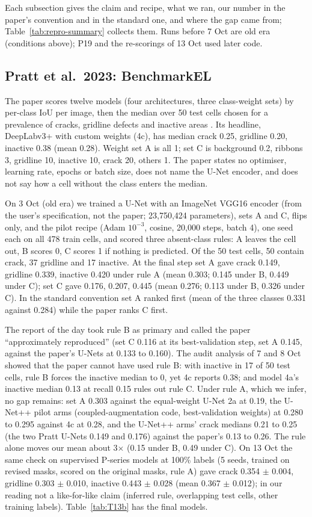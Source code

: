 Each subsection gives the claim and recipe, what we ran, our number in the paper's convention and in the standard one, and where the
gap came from; Table~\ref{tab:repro-summary} collects them. Runs before 7 Oct are old era (conditions above); P19 and the re-scorings
of 13 Oct used later code.

\subsection{Pratt et al.\ 2023: BenchmarkEL}\label{sec:repro-pratt}

The paper scores twelve models (four architectures, three class-weight sets) by per-class IoU per image, then the median over 50 test
cells chosen for a prevalence of cracks, gridline defects and inactive areas \citep{pratt2023benchmark}. Its headline, DeepLabv3+ with
custom weights (4c), has median crack 0.25, gridline 0.20, inactive 0.38 (mean 0.28). Weight set A is all 1; set C is background 0.2,
ribbons 3, gridline 10, inactive 10, crack 20, others 1. The paper states no optimiser, learning rate, epochs or batch size, does not
name the U-Net encoder, and does not say how a cell without the class enters the median.

On 3 Oct (old era) we trained a U-Net with an ImageNet VGG16 encoder (from the user's specification, not the paper; 23,750,424
parameters), sets A and C, flips only, and the pilot recipe (Adam $10^{-3}$, cosine, 20,000 steps, batch 4), one seed each on all 478
train cells, and scored three absent-class rules: A leaves the cell out, B scores 0, C scores 1 if nothing is predicted. Of the 50 test
cells, 50 contain crack, 37 gridline and 17 inactive. At the final step set A gave crack 0.149, gridline 0.339, inactive 0.420 under
rule A (mean 0.303; 0.145 under B, 0.449 under C); set C gave 0.176, 0.207, 0.445 (mean 0.276; 0.113 under B, 0.326 under C). In the
standard convention set A ranked first (mean of the three classes 0.331 against 0.284) while the paper ranks C first.

The report of the day took rule B as primary and called the paper ``approximately reproduced'' (set C 0.116 at its best-validation
step, set A 0.145, against the paper's U-Nets at 0.133 to 0.160). The audit analysis of 7 and 8 Oct showed that the paper cannot have used rule B:
with inactive in 17 of 50 test cells, rule B forces the inactive median to 0, yet 4c reports 0.38; and model 4a's inactive median 0.13 at
recall 0.15 rules out rule C. Under rule A, which we infer, no gap remains: set A 0.303 against the equal-weight U-Net 2a at 0.19,
the U-Net++ pilot arms (coupled-augmentation code, best-validation weights) at 0.280 to 0.295 against 4c at 0.28, and the U-Net++ arms'
crack medians 0.21 to 0.25 (the two Pratt U-Nets 0.149 and 0.176) against the paper's 0.13 to 0.26. The rule alone moves our mean about 3$\times$ (0.15 under B, 0.49 under C). On 13 Oct the same check on
supervised P-series models at 100\% labels (5 seeds, trained on revised masks, scored on the original masks, rule A) gave crack 0.354
$\pm$ 0.004, gridline 0.303 $\pm$ 0.010, inactive 0.443 $\pm$ 0.028 (mean 0.367 $\pm$ 0.012); in our reading not a like-for-like claim
(inferred rule, overlapping test cells, other training labels). Table~\ref{tab:T13b} has the final models.

